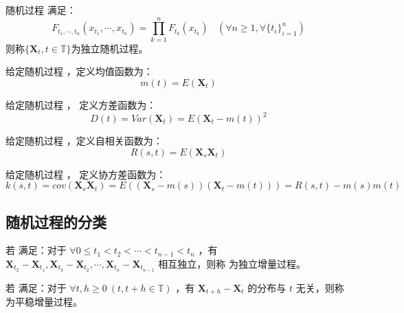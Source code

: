         \begin{definition}[独立随机过程]
            随机过程 \StochasticProcess 满足：
            $$
            F_{t_1, \cdots, t_n}(x_{t_1}, \cdots, x_{t_n}) = \prod_{k=1}^{n} F_{t_k}(x_{t_k})\ \ \ \ (\forall n \geq 1, \forall \{t_i\}_{i=1}^{n})
            $$
            则称$\{\textbf{X}_t, t \in \mathbb{T}\}$为独立随机过程。
        \end{definition}

        \begin{definition}[均值函数]
            给定随机过程 \StochasticProcess，定义均值函数为：
            $$
            m(t) = E(\textbf{X}_t)
            $$
        \end{definition}

        \begin{definition}[方差函数]
            给定随机过程 \StochasticProcess， 定义方差函数为：
            $$
            D(t) = Var(\textbf{X}_t) = E{\left(\textbf{X}_t - m(t)\right)}^2
            $$
        \end{definition}

        \begin{definition}[自相关函数]
            给定随机过程 \StochasticProcess，定义自相关函数为：
            $$
            R(s, t) = E(\textbf{X}_s\textbf{X}_t)
            $$
        \end{definition}

        \begin{definition}[协方差函数]
            给定随机过程 \StochasticProcess， 定义协方差函数为：
            $$
            k(s, t) = cov(\textbf{X}_s \textbf{X}_t) = E((\textbf{X}_s - m(s))(\textbf{X}_t - m(t))) = R(s, t) - m(s)m(t)
            $$
        \end{definition}
    \subsection{随机过程的分类}
        \begin{definition}[独立增量过程]
            若 \StochasticProcess 满足：对于 $\forall 0 \leq t_1 < t_2 < \cdots < t_{n - 1} < t_{n}$ ，有 $\textbf{X}_{t_2} - \textbf{X}_{t_1}, \textbf{X}_{t_3} - \textbf{X}_{t_2}, \cdots, \textbf{X}_{t_n} - \textbf{X}_{t_{n - 1}}$ 相互独立，则称 \StochasticProcess 为独立增量过程。
        \end{definition}

        \begin{definition}[平稳增量过程]
            若 \StochasticProcess 满足：对于 $ \forall t, h \geq 0\ (t, t + h \in \mathbb{T}) $ ，有 $ \textbf{X}_{t + h} - \textbf{X}_{t}$ 的分布与 $t$ 无关，则称 \StochasticProcess 为平稳增量过程。
        \end{definition}

